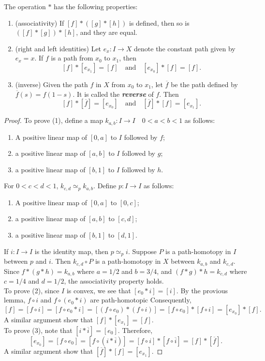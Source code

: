 \begin{mytheorem}
The operation $*$ has the following properties:
\begin{enumerate}[label={(\alph*)}]
\item (associativity) If $[f]*([g]*[h])$ is defined, then so is $([f]*[g])*[h]$, and they are equal.
\item (right and left identities) Let $e_x:I\to X$ denote the constant path given by $e_x=x$. If $f$ is a path from $x_0$ to $x_1$, then
$$[f]*[e_{x_1}]=[f]\quad \text{and}\quad [e_{x_0}]*[f]=[f].$$
\item (inverse) Given the path $f$ in $X$ from $x_0$ to $x_1$, let $\overline{f}$ be the path defined by $\overline{f}(s)=f(1-s)$. It is called the \textbf{\emph{reverse}} of $f$. Then
$$[f]*[\overline{f}]=[e_{x_0}]\quad \text{and}\quad [\overline{f}]*[f]=[e_{x_1}].$$
\end{enumerate}
\end{mytheorem}
\begin{proof}
To prove (1), define a map $k_{a,b}:I\to I\quad 0<a<b<1$ as follows:
\begin{enumerate}[label={(\alph*)}]
\item A positive linear map of $[0,a]$ to $I$ followed by $f$;
\item a positive linear map of $[a,b]$ to $I$ followed by $g$;
\item a positive linear map of $[b,1]$ to $I$ followed by $h$.
\end{enumerate}
For $0<c<d<1$, $k_{c,d} \simeq_p k_{a,b}$. Define $p:I\to I$ as follows:
\begin{enumerate}[label={(\alph*)}]
\item A positive linear map of $[0,a]$ to $[0,c]$;
\item a positive linear map of $[a,b]$ to $[c,d]$;
\item a positive linear map of $[b,1]$ to $[d,1]$.
\end{enumerate}
If $i:I\to I$ is the identity map, then $p \simeq_p i$. Suppose $P$ is a path-homotopy in $I$ between $p$ and $i$. Then $k_{c,d}\circ P$ is a path-homotopy in $X$ between $k_{a,b}$ and $k_{c,d}$. Since $f*(g*h) = k_{a,b}$ where $a=1/2$ and $b=3/4$, and $(f*g)*h=k_{c,d}$ where $c=1/4$ and $d=1/2$, the associativity property holds.\\
To prove (2), since $I$ is convex, we see that $[e_0 * i] = [i]$. By the provious lemma, $f\circ i$ and $f\circ (e_0* i)$ are path-homotopic Consequently,
$$[f] = [f\circ i] = [f\circ e_0*i] = [(f\circ e_0) * (f\circ i)] = [f\circ e_0]* [f\circ i] = [e_{x_0}] * [f].$$
A similar argument show that $[f]*[e_{x_1}]=[f]$.\\
To prove (3), note that $[i*\overline{i}]=[e_0]$. Therefore,
$$[e_{x_0}]=[f\circ e_0]=[f\circ (i*\overline{i})]=[f\circ i]*[f\circ \overline{i}]=[f]*[\overline{f}].$$
A similar argument show that $[\overline{f}]*[f]=[e_{x_1}]$.
\end{proof}


